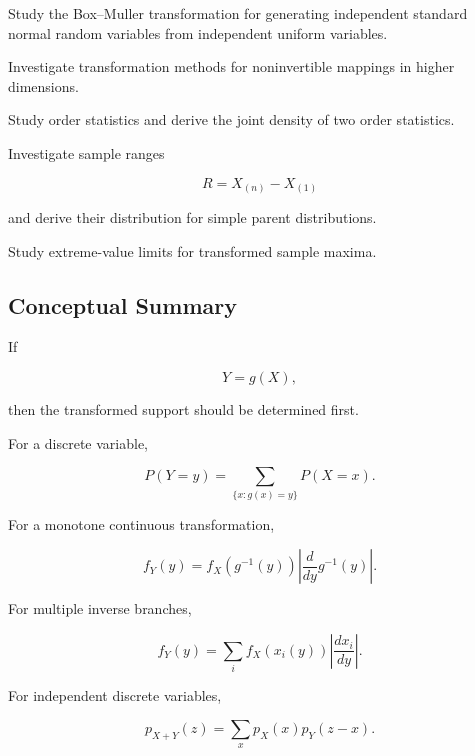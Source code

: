 \begin{exercise}[4]
Study the Box--Muller transformation for generating independent standard
normal random variables from independent uniform variables.
\end{exercise}

\begin{exercise}[4]
Investigate transformation methods for noninvertible mappings in higher
dimensions.
\end{exercise}

\begin{exercise}[4]
Study order statistics and derive the joint density of two order
statistics.
\end{exercise}

\begin{exercise}[4]
Investigate sample ranges

\[
R=X_{(n)}-X_{(1)}
\]

and derive their distribution for simple parent distributions.
\end{exercise}

\begin{exercise}[4]
Study extreme-value limits for transformed sample maxima.
\end{exercise}

\subsection{Conceptual Summary}
\label{subsec:functions-random-variables-summary}

If

\[
Y=g(X),
\]

then the transformed support should be determined first.

For a discrete variable,

\[
\boxed{
P(Y=y)
=
\sum_{\{x:g(x)=y\}}
P(X=x).
}
\]

For a monotone continuous transformation,

\[
\boxed{
f_Y(y)
=
f_X(g^{-1}(y))
\left|
\frac{d}{dy}
g^{-1}(y)
\right|.
}
\]

For multiple inverse branches,

\[
\boxed{
f_Y(y)
=
\sum_i
f_X(x_i(y))
\left|
\frac{dx_i}{dy}
\right|.
}
\]

For independent discrete variables,

\[
\boxed{
p_{X+Y}(z)
=
\sum_x
p_X(x)p_Y(z-x).
}
\]

